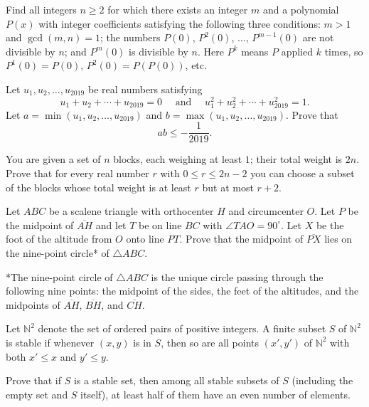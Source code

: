 \documentclass[11pt]{scrartcl}
\begin{document}
\begin{problem}[7904897494032012729]
Find all integers $n \ge 2$ for which there exists an integer $m$ and a polynomial $P(x)$ with integer coefficients satisfying the following three conditions:
$m > 1$ and $\gcd(m,n) = 1$;
the numbers $P(0)$, $P^2(0)$, $\ldots$, $P^{m-1}(0)$ are not divisible by $n$; and
$P^m(0)$ is divisible by $n$.
Here $P^k$ means $P$ applied $k$ times, so $P^1(0) = P(0)$, $P^2(0) = P(P(0))$, etc.
\end{problem}
\begin{problem}[3192129869376364982]
Let $u_1, u_2, \dots, u_{2019}$ be real numbers satisfying\[u_{1}+u_{2}+\cdots+u_{2019}=0 \quad \text { and } \quad u_{1}^{2}+u_{2}^{2}+\cdots+u_{2019}^{2}=1.\]Let $a=\min \left(u_{1}, u_{2}, \ldots, u_{2019}\right)$ and $b=\max \left(u_{1}, u_{2}, \ldots, u_{2019}\right)$. Prove that
\[
a b \leqslant-\frac{1}{2019}.
\]
\end{problem}
\begin{problem}[37921131297270]
	You are given a set of $n$ blocks, each weighing at least $1$; their total weight is $2n$. Prove that for every real number $r$ with $0 \leq r \leq 2n-2$ you can choose a subset of the blocks whose total weight is at least $r$ but at most $r + 2$.
\end{problem}
\begin{problem}[528087142744727]
	Let $ABC$ be a scalene triangle with orthocenter $H$ and circumcenter $O$. Let $P$ be the midpoint of $\overline{AH}$ and let $T$ be on line $BC$ with $\angle TAO=90^{\circ}$. Let $X$ be the foot of the altitude from $O$ onto line $PT$. Prove that the midpoint of $\overline{PX}$ lies on the nine-point circle* of $\triangle ABC$.

*The nine-point circle of $\triangle ABC$ is the unique circle passing through the following nine points: the midpoint of the sides, the feet of the altitudes, and the midpoints of $\overline{AH}$, $\overline{BH}$, and $\overline{CH}$.
\end{problem}
\begin{problem}[645930596871591]
Let $\mathbb{N}^2$ denote the set of ordered pairs of positive integers. A finite subset $S$ of $\mathbb{N}^2$ is stable if whenever $(x,y)$ is in $S$, then so are all points $(x',y')$ of $\mathbb{N}^2$ with both $x'\leq x$ and $y'\leq y$.

Prove that if $S$ is a stable set, then among all stable subsets of $S$ (including the empty set and $S$ itself), at least half of them have an even number of elements.
\end{problem}
\end{document}
